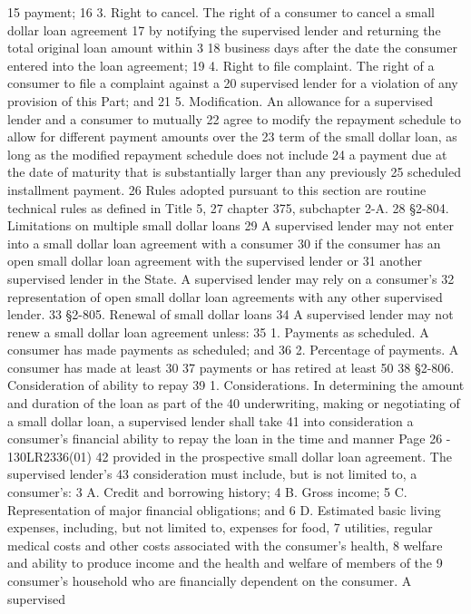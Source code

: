 15 payment;
16 3. Right to cancel. The right of a consumer to cancel a small dollar loan agreement
17 by notifying the supervised lender and returning the total original loan amount within 3
18 business days after the date the consumer entered into the loan agreement;
19 4. Right to file complaint. The right of a consumer to file a complaint against a
20 supervised lender for a violation of any provision of this Part; and
21 5. Modification. An allowance for a supervised lender and a consumer to mutually
22 agree to modify the repayment schedule to allow for different payment amounts over the
23 term of the small dollar loan, as long as the modified repayment schedule does not include
24 a payment due at the date of maturity that is substantially larger than any previously
25 scheduled installment payment.
26 Rules adopted pursuant to this section are routine technical rules as defined in Title 5,
27 chapter 375, subchapter 2-A.
28 §2-804. Limitations on multiple small dollar loans
29 A supervised lender may not enter into a small dollar loan agreement with a consumer
30 if the consumer has an open small dollar loan agreement with the supervised lender or
31 another supervised lender in the State. A supervised lender may rely on a consumer's
32 representation of open small dollar loan agreements with any other supervised lender.
33 §2-805. Renewal of small dollar loans
34 A supervised lender may not renew a small dollar loan agreement unless:
35 1. Payments as scheduled. A consumer has made payments as scheduled; and
36 2. Percentage of payments. A consumer has made at least 30%
37 payments or has retired at least 50%
38 §2-806. Consideration of ability to repay
39 1. Considerations. In determining the amount and duration of the loan as part of the
40 underwriting, making or negotiating of a small dollar loan, a supervised lender shall take
41 into consideration a consumer's financial ability to repay the loan in the time and manner 
Page 26 - 130LR2336(01)
42 provided in the prospective small dollar loan agreement. The supervised lender's
43 consideration must include, but is not limited to, a consumer's:
3 A. Credit and borrowing history;
4 B. Gross income;
5 C. Representation of major financial obligations; and
6 D. Estimated basic living expenses, including, but not limited to, expenses for food,
7 utilities, regular medical costs and other costs associated with the consumer's health,
8 welfare and ability to produce income and the health and welfare of members of the
9 consumer's household who are financially dependent on the consumer. A supervised

